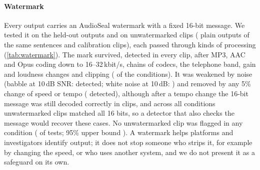 \paragraph{Watermark}
Every output carries an AudioSeal watermark with a fixed 16-bit message. We tested it on the  held-out
\BA outputs and on  unwatermarked clips ( plain \vox outputs of the same sentences and
 calibration clips), each passed through  kinds of processing (\cref{tab:watermark}). The
mark survived, detected in every clip, after MP3, AAC and Opus coding down to 16--32\,kbit/s, chains of codecs, the
telephone band, gain and loudness changes and clipping ( of the  conditions). It was
weakened by noise (babble at 10\,dB SNR:  detected; white noise at 10\,dB:
) and removed by any 5\% change of speed or tempo ( detected),
although after a tempo change the 16-bit message was still decoded correctly in  clips,
and across all conditions  unwatermarked clips matched all 16 bits, so a detector that also checks
the message would recover these cases. No unwatermarked clip was flagged in
any condition ( of  tests; 95\% upper bound ). A watermark helps platforms and
investigators identify \BA output; it does not stop someone who strips it, for example by changing the speed, or who
uses another system, and we do not present it as a safeguard on its own.
